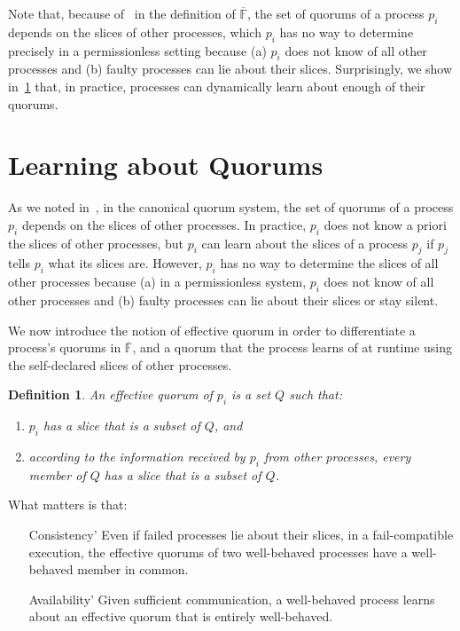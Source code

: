 \documentclass[11pt,letterpaper]{article}
\newtheorem{definition}{Definition}
\begin{document}
Note that, because of~ in the definition of $\overline{\mathbb{F}}$, the set of quorums of a process $p_i$ depends on the slices of other processes, which $p_i$ has no way to determine precisely in a permissionless setting because (a) $p_i$ does not know of all other processes and (b) faulty processes can lie about their slices.
Surprisingly, we show in~\cref{sec:learning} that, in practice, processes can dynamically learn about enough of their quorums.

\section{Learning about Quorums}
\label{sec:learning}

As we noted in~, in the canonical quorum system, the set of quorums of a process $p_i$ depends on the slices of other processes.
In practice, $p_i$ does not know a priori the slices of other processes, but $p_i$ can learn about the slices of a process $p_j$ if $p_j$ tells $p_i$ what its slices are.
However, $p_i$ has no way to determine the slices of all other processes because (a) in a permissionless system, $p_i$ does not know of all other processes and (b) faulty processes can lie about their slices or stay silent.

We now introduce the notion of effective quorum in order to differentiate a process's quorums in $\overline{\mathbb{F}}$, and a quorum that the process learns of at runtime using the self-declared slices of other processes.

\begin{definition}
  An effective quorum of $p_i$ is a set $Q$ such that:
  \begin{enumerate}
    \item $p_i$ has a slice that is a subset of $Q$, and
    \item according to the information received by $p_i$ from other processes, every member of $Q$ has a slice that is a subset of $Q$.
  \end{enumerate}
\end{definition}

What matters is that:
\begin{enumerate}
  \item[Consistency'] Even if failed processes lie about their slices, in a fail-compatible execution, the effective quorums of two well-behaved processes have a well-behaved member in common.
  \item[Availability'] Given sufficient communication, a well-behaved process learns about an effective quorum that is entirely well-behaved.
\end{enumerate}
\end{document}
